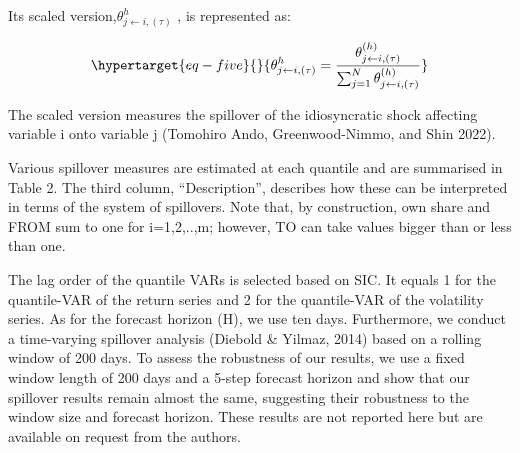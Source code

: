 \documentclass[
  letterpaper,
  DIV=11,
  numbers=noendperiod]{scrartcl}
\begin{document}
Its scaled version,\(\theta_{j\leftarrow i,(\tau)}^h\) , is represented
as:

\begin{equation}\protect\hypertarget{eq-five}{}{
\theta_{j\leftarrow i,(\tau)}^h=\frac{\theta^{(h)}_{j \leftarrow i,(\tau)}}{\sum_{j=1}^N \theta^{(h)}_{j \leftarrow i,(\tau)}}
}\label{eq-five}\end{equation}

The scaled version measures the spillover of the idiosyncratic shock
affecting variable i onto variable j (Tomohiro Ando, Greenwood-Nimmo,
and Shin 2022).

Various spillover measures are estimated at each quantile and are
summarised in Table 2. The third column, ``Description'', describes how
these can be interpreted in terms of the system of spillovers. Note
that, by construction, own share and FROM sum to one for i=1,2,..,m;
however, TO can take values bigger than or less than one.

The lag order of the quantile VARs is selected based on SIC. It equals 1
for the quantile-VAR of the return series and 2 for the quantile-VAR of
the volatility series. As for the forecast horizon (H), we use ten days.
Furthermore, we conduct a time-varying spillover analysis (Diebold \&
Yilmaz, 2014) based on a rolling window of 200 days. To assess the
robustness of our results, we use a fixed window length of 200 days and
a 5-step forecast horizon and show that our spillover results remain
almost the same, suggesting their robustness to the window size and
forecast horizon. These results are not reported here but are available
on request from the authors.
\end{document}
